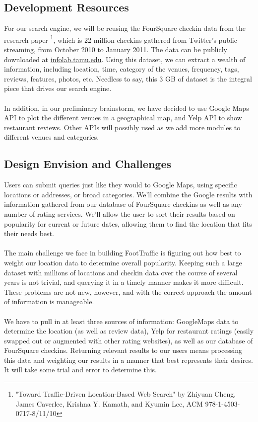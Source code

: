 \documentclass{article}
\begin{document}
\subsection{Development Resources}
For our search engine, we will be reusing the FourSquare checkin data from the research paper
\footnote{"Toward Traffic-Driven Location-Based Web Search" by Zhiyuan Cheng, James Caverlee, Krishna Y. Kamath, and Kyumin Lee, ACM 978-1-4503-0717-8/11/10},
which is 22 million checkins gathered from Twitter's public streaming, from October 2010 to January 2011. 
The data can be publicly downloaded at \href{http://infolab.tamu.edu/static/users/zhiyuan/icwsm_2011.zip}{infolab.tamu.edu}.
Using this dataset, we can extract a wealth of information, including location, time, category of the
venues, frequency, tags, reviews, features, photos, etc. Needless to say, this 3 GB of dataset is the
integral piece that drives our search engine.
\\ \\
In addition, in our preliminary brainstorm, we have decided to use Google Maps API to plot the different
venues in a geographical map, and Yelp API to show restaurant reviews. Other APIs will possibly used
as we add more modules to different venues and categories.

\subsection{Design Envision and Challenges}
Users can submit queries just like they would to Google Maps, using specific locations or addresses,
or broad categories. We'll combine the Google results with information gathered from our database of
FourSquare checkins as well as any number of rating services. We'll allow the user to sort their results
based on popularity for current or future dates, allowing them to find the location that fits their needs best.
\\ \\
The main challenge we face in building FootTraffic is figuring out how best to weight our location data
to determine overall popularity. Keeping such a large dataset with millions of locations and checkin
data over the course of several years is not trivial, and querying it in a timely manner makes it more difficult.
These problems are not new, however, and with the correct approach the amount of information is manageable.
\\ \\
We have to pull in at least three sources of information: GoogleMaps data to determine the location (as
well as review data), Yelp for restaurant ratings (easily swapped out or augmented with other rating
websites), as well as our database of FourSquare checkins. Returning relevant results to our users means
processing this data and weighting our results in a manner that best represents their desires. It will
take some trial and error to determine this.
\end{document}
